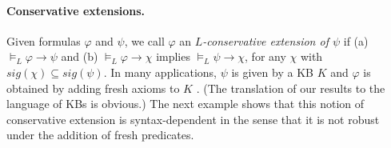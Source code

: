 \documentclass{lmcs} %
\theoremstyle{plain}\newtheorem{satz}[thm]{Satz} %
\newcommand{\sig}{\mathit{sig}}
\begin{document}
\paragraph{Conservative extensions.} Given formulas $\varphi$ and $\psi$, we call $\varphi$ an \emph{$L$-conservative extension of $\psi$} if (a) $\models_{L}\varphi \rightarrow \psi$ and (b) $\models_L \varphi \rightarrow \chi$ implies $\models_{L}\psi \rightarrow \chi$, for any $\chi$ with $\sig(\chi)\subseteq \sig(\psi)$. In many applications, $\psi$ is given by a KB $K$ and $\varphi$ is obtained by adding fresh axioms to $K$ \cite{DBLP:conf/kr/GhilardiLW06,AIJ10}. (The translation of our results to the language of KBs is obvious.) The next example shows that this notion of conservative extension is 
syntax-dependent in the sense that it is not robust under the addition of fresh predicates. 
%
\end{document}
